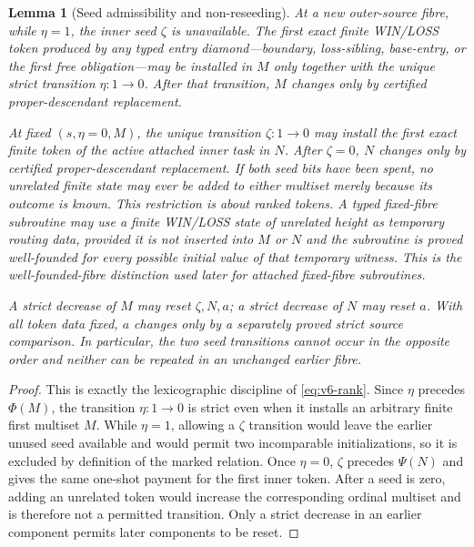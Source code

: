 \documentclass[11pt]{article}
\newtheorem{lemma}[theorem]{Lemma}
\begin{document}
\begin{lemma}[Seed admissibility and non-reseeding]\label{lem:seed-policy}
At a new outer-source fibre, while $\eta=1$, the inner seed $\zeta$ is
unavailable.  The first exact finite WIN/LOSS token produced by any typed
entry diamond---boundary, loss-sibling, base-entry, or the first free
obligation---may be installed in $M$ only together with the unique strict
transition $\eta:1\to0$.  After that transition, $M$ changes only by
certified proper-descendant replacement.

At fixed $(s,\eta=0,M)$, the unique transition $\zeta:1\to0$ may install the
first exact finite token of the active attached inner task in $N$.  After
$\zeta=0$, $N$ changes only by certified proper-descendant replacement.  If
both seed bits have been spent, no unrelated finite state may ever be added
to either multiset merely because its outcome is known.  This restriction is
about \emph{ranked tokens}.  A typed fixed-fibre subroutine may use a finite
WIN/LOSS state of unrelated height as temporary routing data, provided it is
not inserted into $M$ or $N$ and the subroutine is proved well-founded for
every possible initial value of that temporary witness.  This is the well-founded-fibre distinction used later for attached fixed-fibre subroutines.

A strict decrease of $M$ may reset $\zeta,N,a$; a strict decrease of $N$ may
reset $a$.  With all token data fixed, $a$ changes only by a separately
proved strict source comparison.  In particular, the two seed transitions
cannot occur in the opposite order and neither can be repeated in an
unchanged earlier fibre.
\end{lemma}

\begin{proof}
This is exactly the lexicographic discipline of \eqref{eq:v6-rank}.  Since
$\eta$ precedes $\Phi(M)$, the transition $\eta:1\to0$ is strict even when it
installs an arbitrary finite first multiset $M$.  While $\eta=1$, allowing a
$\zeta$ transition would leave the earlier unused seed available and would
permit two incomparable initializations, so it is excluded by definition of
the marked relation.  Once $\eta=0$, $\zeta$ precedes $\Psi(N)$ and gives the
same one-shot payment for the first inner token.  After a seed is zero, adding
an unrelated token would increase the corresponding ordinal multiset and is
therefore not a permitted transition.  Only a strict decrease in an earlier
component permits later components to be reset.
\end{proof}
\end{document}
